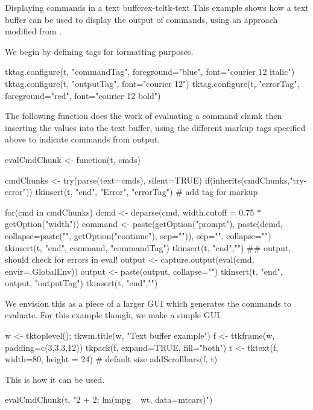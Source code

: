 \begin{example}{Displaying commands in a text buffer}{ex-tcltk-text}
This example shows how a text buffer can be used to display the output
of \R\/ commands, using an approach modified from .

We begin by defining tags for formatting purposes.
\begin{Schunk}
\begin{Sinput}
 tktag.configure(t, "commandTag", foreground="blue", 
                 font="courier 12 italic")
 tktag.configure(t, "outputTag", font="courier 12")
 tktag.configure(t, "errorTag", foreground="red", 
                 font="courier 12 bold")
\end{Sinput}
\end{Schunk}

The following function does the work of evaluating a command chunk
then inserting the values into the text buffer, using the different
markup tags specified above to indicate commands from output.

\begin{Schunk}
\begin{Sinput}
 evalCmdChunk <- function(t, cmds) {
   
   cmdChunks <- try(parse(text=cmds), silent=TRUE)
   if(inherits(cmdChunks,"try-error")) {
     tkinsert(t, "end", "Error", "errorTag") # add tag for markup
   }
 
   for(cmd in cmdChunks) {
     dcmd <- deparse(cmd, width.cutoff = 0.75 * getOption("width"))
     command <- 
       paste(getOption("prompt"),
             paste(dcmd, collapse=paste("\n", getOption("continue"), 
                           sep="")),
             sep="", collapse="")
     tkinsert(t, "end", command, "commandTag")
     tkinsert(t, "end","\n")
     ## output, should check for errors in eval!
     output <- capture.output(eval(cmd, envir=.GlobalEnv))
     output <- paste(output, collapse="\n")
     tkinsert(t, "end", output, "outputTag")
     tkinsert(t, "end","\n")
   }
 }
\end{Sinput}
\end{Schunk}


We envision this as a piece of a larger GUI which generates the
commands to evaluate. For this example though, we make a simple GUI.

\begin{Schunk}
\begin{Sinput}
 w <- tktoplevel(); tkwm.title(w, "Text buffer example")
 f <- ttkframe(w, padding=c(3,3,3,12))
 tkpack(f, expand=TRUE, fill="both")
 t <- tktext(f, width=80, height = 24)   # default size
 addScrollbars(f, t)
\end{Sinput}
\end{Schunk}
 
This is how it can be used.
\begin{Schunk}
\begin{Sinput}
 evalCmdChunk(t, "2 + 2; lm(mpg ~ wt, data=mtcars)")
\end{Sinput}
\end{Schunk}
\end{example}


